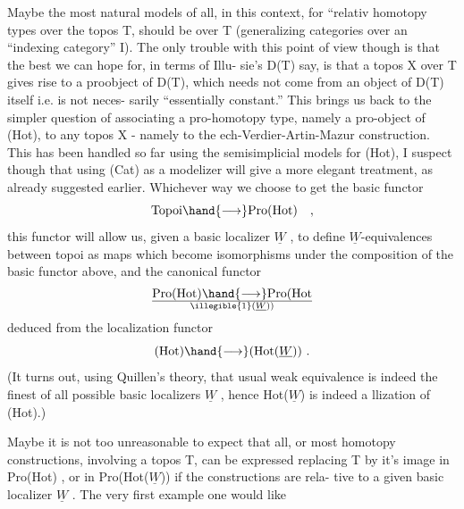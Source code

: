 Maybe the most natural models of all, in this context, for ``relativ
homotopy types over the topos T, should be \hand{\uline{\textcolor{black}{topoI}}}  over T (generalizing 
categories over an ``indexing category'' I). The only trouble with this
point of view though is that the best we can hope for, in terms of Illu-%
sie's D(T) say, is that a topos X over T gives rise to a proobject of
D(T), which needs not come from an object of D(T) itself i.e. is not neces-%
sarily  ``essentially constant.'' This brings us back to the simpler
 question of associating a pro-homotopy type, namely a pro-object of (Hot),
to any topos X - namely  to the \hand{\v{\textcolor{black}{C}}}ech-Verdier-Artin-Mazur construction.
This has been handled so far using the semisimplicial models for (Hot),
I suspect though that using (Cat) as a modelizer will give a more elegant
treatment, as already suggested earlier. Whichever way we choose to get
the basic functor
\[ \text{Topoi} \hand{\longrightarrow} \text{Pro(Hot)} \quad , \]
this functor will allow us, given a basic localizer $\underline{W}$ , to define
$\underline{W}$-equivalences between topoi\hand{\unsure{,}} as maps  which become isomorphisms
under the composition of the basic functor above, and the canonical
functor
\[ \text{Pro(Hot)} \hand{\longrightarrow} \text{Pro(Hot}\over{\illegible{1}}{(}\underline{W})) \]
deduced from the localization functor 
\[ \text{(Hot)} \hand{\longrightarrow} \text{(Hot(}\underline{W})) \ . \]
(It turns out, using Quillen's theory, that usual weak equivalence is
indeed the finest of all possible basic localizers $\underline{W}$ , hence Hot($\underline{W}$) is
indeed a llization of (Hot).)

Maybe it is not too unreasonable to expect that all, or most homotopy
constructions, involving a topos T, can be expressed  replacing T by
it's image in Pro(Hot) , or in Pro(Hot($\underline{W}$)) if the constructions are rela-%
tive to a given basic localizer $\underline{W}$ . The very first example one would like

